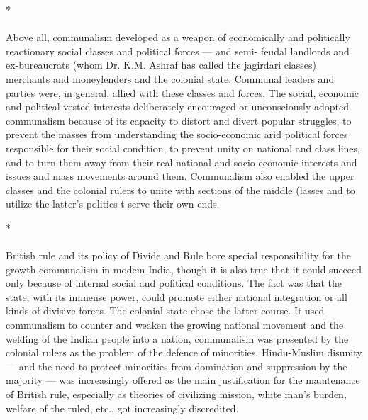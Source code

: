 \begin{multicols}{2}
\begin{center}*\end{center}

\paragraph*{}

Above all, communalism developed as a weapon of economically and politically reactionary social classes and political forces --- and semi- feudal landlords and ex-bureaucrats (whom Dr. K.M. Ashraf has called the jagirdari classes) merchants and moneylenders and the colonial state. Communal leaders and parties were, in general, allied with these classes and forces. The social, economic and political vested interests deliberately encouraged or unconsciously adopted communalism because of its capacity to distort and divert popular struggles, to prevent the masses from understanding the socio-economic arid political forces responsible for their social condition, to prevent unity on national and class lines, and to turn them away from their real national and socio-economic interests and issues and mass movements around them. Communalism also enabled the upper classes and the colonial rulers to unite with sections of the middle (lasses and to utilize the latter's politics t serve their own ends.

\begin{center}*\end{center}

\paragraph*{}

British rule and its policy of Divide and Rule bore special responsibility for the growth communalism in modem India, though it is also true that it could succeed only because of internal social and political conditions. The fact was that the state, with its immense power, could promote either national integration or all kinds of divisive forces. The colonial state chose the latter course. It used communalism to counter and weaken the growing national movement and the welding of the Indian people into a nation, communalism was presented by the colonial rulers as the problem of the defence of minorities. Hindu-Muslim disunity --- and the need to protect minorities from domination and suppression by the majority --- was increasingly offered as the main justification for the maintenance of British rule, especially as theories of civilizing mission, white man's burden, welfare of the ruled, etc., got increasingly discredited. 


\end{multicols}
